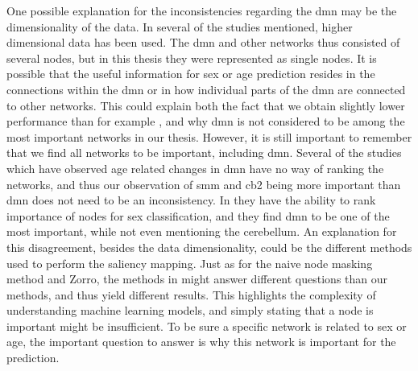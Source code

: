 One possible explanation for the inconsistencies regarding the \acrshort{dmn} may be the dimensionality of the data. In several of the studies mentioned, higher dimensional data has been used. The \acrshort{dmn} and other networks thus consisted of several nodes, but in this thesis they were represented as single nodes. It is possible that the useful information for sex or age prediction resides in the connections within the \acrshort{dmn} or in how individual parts of the \acrshort{dmn} are connected to other networks. This could explain both the fact that we obtain slightly lower performance than for example \cite{arslan, understanding_gnn}, and why \acrshort{dmn} is not considered to be among the most important networks in our thesis. However, it is still important to remember that we find all networks to be important, including \acrshort{dmn}. Several of the studies which have observed age related changes in \acrshort{dmn} \cite{meier_svm, song_reorganizational, tomasi_aging} have no way of ranking the networks, and thus our observation of \acrshort{smm} and \acrshort{cb2} being more important than \acrshort{dmn} does not need to be an inconsistency. In \cite{arslan, understanding_gnn} they have the ability to rank importance of nodes for sex classification, and they find \acrshort{dmn} to be one of the most important, while not even mentioning the cerebellum. An explanation for this disagreement, besides the data dimensionality, could be the different methods used to perform the saliency mapping. Just as for the naive node masking method and Zorro, the methods in \cite{understanding_gnn, arslan} might answer different questions than our methods, and thus yield different results. This highlights the complexity of understanding machine learning models, and simply stating that a node is important might be insufficient. To be sure a specific network is related to sex or age, the important question to answer is why this network is important for the prediction. 

